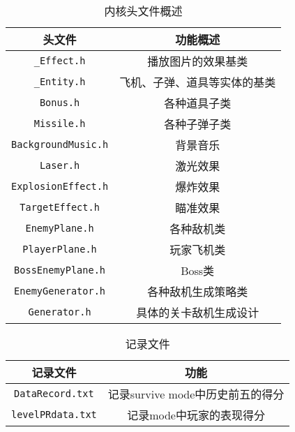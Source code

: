 \documentclass[UTF8,12pt]{ctexart}
\begin{document}
	        \begin{table}[h]
	            \centering
	            \caption{内核头文件概述}
	            \begin{tabular}{cc}
	                \toprule
	                头文件                        & 功能概述           \\
	                \midrule
	                \texttt{\_Effect.h}        & 播放图片的效果基类      \\
	                \texttt{\_Entity.h}        & 飞机、子弹、道具等实体的基类 \\
	                \texttt{Bonus.h}           & 各种道具子类         \\
	                \texttt{Missile.h}         & 各种子弹子类         \\
	                \texttt{BackgroundMusic.h} & 背景音乐           \\
	                \texttt{Laser.h}           & 激光效果           \\
	                \texttt{ExplosionEffect.h} & 爆炸效果           \\
	                \texttt{TargetEffect.h}    & 瞄准效果           \\
	                \texttt{EnemyPlane.h}      & 各种敌机类          \\
	                \texttt{PlayerPlane.h}     & 玩家飞机类          \\
	                \texttt{BossEnemyPlane.h}  & Boss类          \\
	                \texttt{EnemyGenerator.h}  & 各种敌机生成策略类      \\
	                \texttt{Generator.h}       & 具体的关卡敌机生成设计    \\

	                \bottomrule
	            \end{tabular}
	        \end{table}

	        \begin{table}[h]
	            \centering
	            \caption{记录文件}
	            \begin{tabular}{cc}
	                \toprule
	                记录文件                     & 功能                     \\
	                \midrule
	                \texttt{DataRecord.txt}  & 记录survive mode中历史前五的得分 \\
	                \texttt{levelPRdata.txt} & 记录mode中玩家的表现得分         \\
	                \bottomrule
	            \end{tabular}
	        \end{table}
\end{document}
